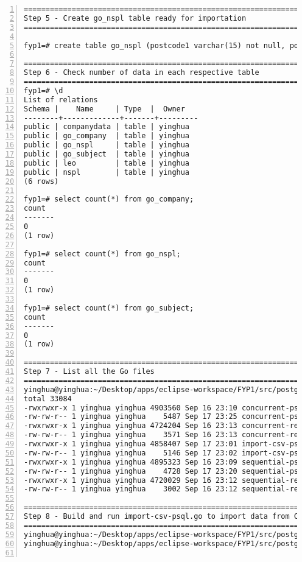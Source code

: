 \begin{lstlisting}[breaklines, frame=single, numbers=left, caption={Linux command for import data}, label=commandline-02]
==================================================================
Step 5 - Create go_nspl table ready for importation 
==================================================================

fyp1=# create table go_nspl (postcode1 varchar(15) not null, postcode2 varchar(15) not null primary key, date_introduce varchar(10) not null,usertype int not null, position_quality int not null);

==================================================================
Step 6 - Check number of data in each respective table
==================================================================
fyp1=# \d
List of relations
Schema |    Name     | Type  |  Owner  
--------+-------------+-------+---------
public | companydata | table | yinghua
public | go_company  | table | yinghua
public | go_nspl     | table | yinghua
public | go_subject  | table | yinghua
public | leo         | table | yinghua
public | nspl        | table | yinghua
(6 rows)

fyp1=# select count(*) from go_company;
count 
-------
0
(1 row)

fyp1=# select count(*) from go_nspl;
count 
-------
0
(1 row)

fyp1=# select count(*) from go_subject;
count 
-------
0
(1 row)

==================================================================
Step 7 - List all the Go files 
==================================================================
yinghua@yinghua:~/Desktop/apps/eclipse-workspace/FYP1/src/postgres-process$ ls -l
total 33084
-rwxrwxr-x 1 yinghua yinghua 4903560 Sep 16 23:10 concurrent-psql
-rw-rw-r-- 1 yinghua yinghua    5487 Sep 17 23:25 concurrent-psql.go
-rwxrwxr-x 1 yinghua yinghua 4724204 Sep 16 23:13 concurrent-read-csv
-rw-rw-r-- 1 yinghua yinghua    3571 Sep 16 23:13 concurrent-read-csv.go
-rwxrwxr-x 1 yinghua yinghua 4858407 Sep 17 23:01 import-csv-psql
-rw-rw-r-- 1 yinghua yinghua    5146 Sep 17 23:02 import-csv-psql.go
-rwxrwxr-x 1 yinghua yinghua 4895323 Sep 16 23:09 sequential-psql
-rw-rw-r-- 1 yinghua yinghua    4728 Sep 17 23:20 sequential-psql.go
-rwxrwxr-x 1 yinghua yinghua 4720029 Sep 16 23:12 sequential-read-csv
-rw-rw-r-- 1 yinghua yinghua    3002 Sep 16 23:12 sequential-read-csv.go

===============================================================================
Step 8 - Build and run import-csv-psql.go to import data from CSV to PostgreSQL
===============================================================================
yinghua@yinghua:~/Desktop/apps/eclipse-workspace/FYP1/src/postgres-process$ go build import-csv-psql.go
yinghua@yinghua:~/Desktop/apps/eclipse-workspace/FYP1/src/postgres-process$ time go run import-csv-psql.go


\end{lstlisting}
